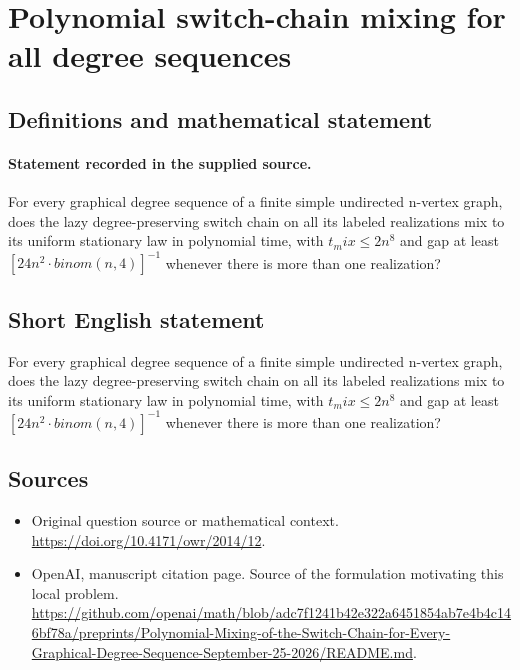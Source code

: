 \documentclass[11pt]{article}
\begin{document}
\section*{Polynomial switch-chain mixing for all degree sequences}\label{30007441}
\subsection{Definitions and mathematical statement}
\paragraph{Statement recorded in the supplied source.}
For every graphical degree sequence of a finite simple undirected n-vertex graph, does the lazy degree-preserving switch chain on all its labeled realizations mix to its uniform stationary law in polynomial time, with $t_mix\leq 2n^{8}$ and gap at least $[24n^{2}\cdot binom(n,4)]^{-1}$ whenever there is more than one realization?
\subsection{Short English statement}
For every graphical degree sequence of a finite simple undirected n-vertex graph, does the lazy degree-preserving switch chain on all its labeled realizations mix to its uniform stationary law in polynomial time, with $t_mix\leq 2n^{8}$ and gap at least $[24n^{2}\cdot binom(n,4)]^{-1}$ whenever there is more than one realization?
\subsection{Sources}
\begin{itemize}
\item[S1] Original question source or mathematical context.
\url{https://doi.org/10.4171/owr/2014/12}.
\item[S2] OpenAI, manuscript citation page. Source of the formulation motivating this local problem.
\url{https://github.com/openai/math/blob/adc7f1241b42e322a6451854ab7e4b4c146bf78a/preprints/Polynomial-Mixing-of-the-Switch-Chain-for-Every-Graphical-Degree-Sequence-September-25-2026/README.md}.
\end{itemize}
\end{document}

